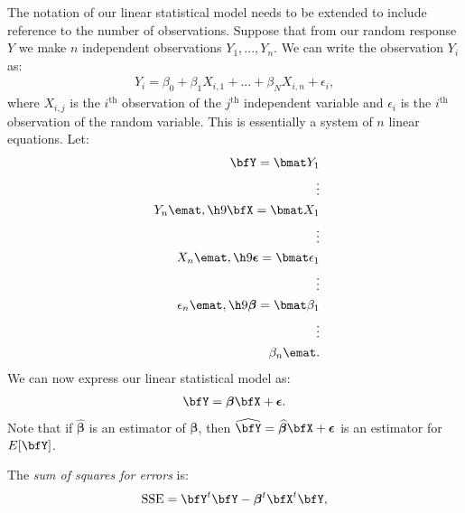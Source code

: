     The notation of our linear statistical model needs to be extended to include reference to the number of observations. Suppose that from our random response $Y$ we make $n$ independent observations $Y_1,...,Y_n$. We can write the observation $Y_i$ as:
        \begin{equation*}
        \begin{split}
            Y_i = \beta_0 + \beta_1 X_{i,1} + ... + \beta_N X_{i,n} + \epsilon_i,
        \end{split}
        \end{equation*}
    where $X_{i,j}$ is the $i^\text{th}$ observation of the $j^\text{th}$ independent variable and $\epsilon_i$ is the $i^\text{th}$ observation of the random variable. This is essentially a system of $n$ linear equations. Let:
        \begin{equation*}
        \begin{split}
            \bfY = \bmat Y_1 \\ \vdots \\\ Y_n \emat, \h9 \bfX = \bmat X_1 \\ \vdots \\\ X_n \emat, \h9 \boldsymbol{\epsilon} = \bmat \epsilon_1 \\ \vdots \\\ \epsilon_n \emat, \h9 \boldsymbol{\beta} =\bmat \beta_1 \\ \vdots \\\ \beta_n \emat.
        \end{split}
        \end{equation*}
    We can now express our linear statistical model as:
        \begin{equation*}
        \begin{split}
            \bfY = \boldsymbol{\beta}\bfX + \boldsymbol{\epsilon}.
        \end{split}
        \end{equation*}
    Note that if $\widehat{\boldsymbol{\beta}}$ is an estimator of $\boldsymbol{\beta}$, then $\widehat{\bfY} = \widehat{\boldsymbol{\beta}}\bfX + \boldsymbol{\epsilon}$ is an estimator for $E[\bfY]$. 

    \begin{definition}
        The \textit{sum of squares for errors} is:
            \begin{equation*}
            \begin{split}
                \text{SSE} = \bfY^t \bfY - \boldsymbol{\beta}^t \bfX^t \bfY,
            \end{split}
            \end{equation*}
    \end{definition}

